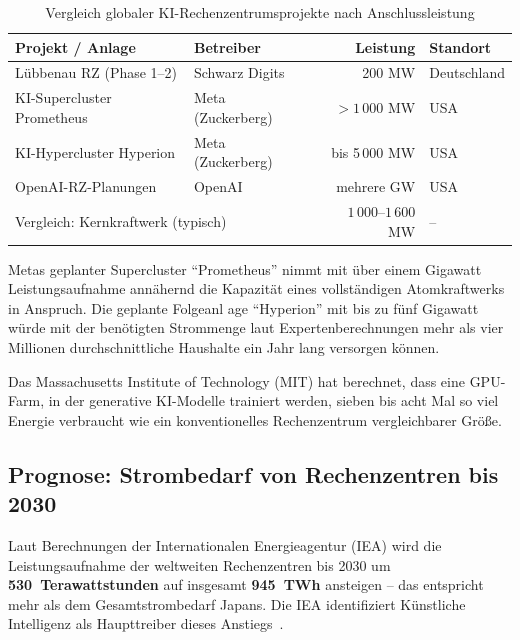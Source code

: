 ﻿\documentclass[12pt, a4paper, openany]{report}
\begin{document}
\begin{table}[H]
	\centering
	\caption{Vergleich globaler KI-Rechenzentrumsprojekte nach Anschlussleistung}
	\label{tab:leistungsvergleich}
	\begin{tabularx}{0.88\textwidth}{l l r l}
		\toprule
		\textbf{Projekt / Anlage} & \textbf{Betreiber} & \textbf{Leistung} & \textbf{Standort} \\
		\midrule
		Lübbenau RZ (Phase 1--2)  & Schwarz Digits & 200 MW  & Deutschland \\
		KI-Supercluster Prometheus & Meta (Zuckerberg) & $> 1\,000$ MW  & USA \\
		KI-Hypercluster Hyperion   & Meta (Zuckerberg) & bis 5\,000 MW   & USA \\
		OpenAI-RZ-Planungen        & OpenAI & mehrere GW   & USA \\
		\midrule
		\multicolumn{2}{l}{Vergleich: Kernkraftwerk (typisch)} & $1\,000$--$1\,600$ MW & -- \\
		\bottomrule
	\end{tabularx}
\end{table}

\noindent
Metas geplanter Supercluster ``Prometheus'' nimmt mit über einem Gigawatt
Leistungsaufnahme annähernd die Kapazität eines vollständigen Atomkraftwerks
in Anspruch. Die geplante Folgeanl age ``Hyperion'' mit bis zu fünf Gigawatt
würde mit der benötigten Strommenge laut Expertenberechnungen mehr als vier
Millionen durchschnittliche Haushalte ein Jahr lang versorgen können.

Das Massachusetts Institute of Technology (MIT) hat berechnet, dass eine
GPU-Farm, in der generative KI-Modelle trainiert werden, sieben bis acht
Mal so viel Energie verbraucht wie ein konventionelles Rechenzentrum
vergleichbarer Größe.

\subsection{Prognose: Strombedarf von Rechenzentren bis 2030}

Laut Berechnungen der Internationalen Energieagentur (IEA) wird die
Leistungsaufnahme der weltweiten Rechenzentren bis 2030 um
\textbf{530~Terawattstunden} auf insgesamt \textbf{945~TWh} ansteigen --
das entspricht mehr als dem Gesamtstrombedarf Japans. Die IEA identifiziert
Künstliche Intelligenz als Haupttreiber dieses Anstiegs~\cite{iea2024}.
\end{document}
